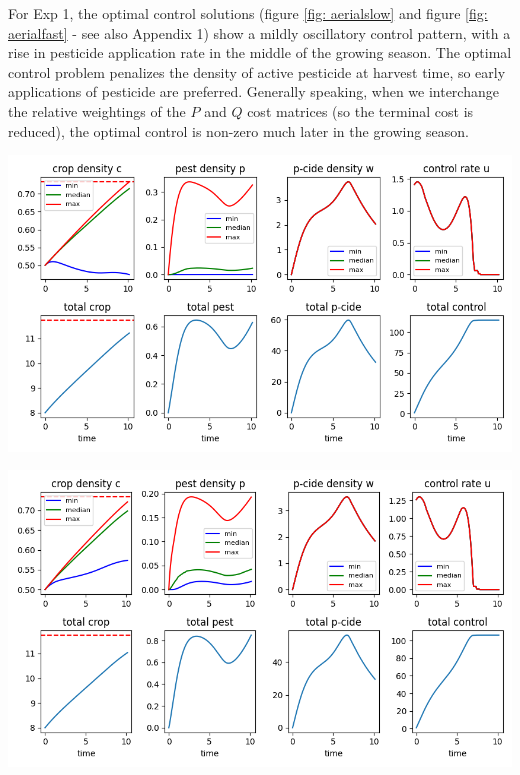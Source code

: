 \documentclass[11pt]{article}
\begin{document}
For Exp 1, the optimal control solutions (figure \ref{fig: aerialslow} and figure \ref{fig: aerialfast} - see also Appendix 1) show a mildly oscillatory control pattern, with a rise in pesticide application rate in the middle of the growing season. The optimal control problem penalizes the density of active pesticide at harvest time, so early applications of pesticide are preferred. Generally speaking, when we interchange the relative weightings of the $P$ and $Q$ cost matrices (so the terminal cost is reduced), the optimal control is non-zero much later in the growing season.

\begin{minipage}{\textwidth}
	\begin{center}
		\includegraphics[width=0.8\linewidth]{../resim_240718-021040/time.png}
		\label{fig: aerialslow}
	\end{center}
\end{minipage}

\begin{minipage}{\textwidth}
	\begin{center}		
		\includegraphics[width=0.8\linewidth]{../resim_240718-005456/time.png}
		\label{fig: aerialfast}
	\end{center}
\end{minipage}
\end{document}
